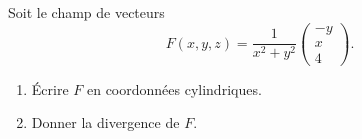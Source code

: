 
\begin{exercice}\label{exoOutilsMath-0084}

    Soit le champ de vecteurs 
    \begin{equation}
        F(x,y,z)=\frac{1}{ x^2+y^2 }\begin{pmatrix}
            -y    \\ 
            x    \\ 
            4    
        \end{pmatrix}.
    \end{equation}
    \begin{enumerate}
        \item
            Écrire $F$ en coordonnées cylindriques.
        \item
            Donner la divergence de $F$.
    \end{enumerate}

\end{exercice}
